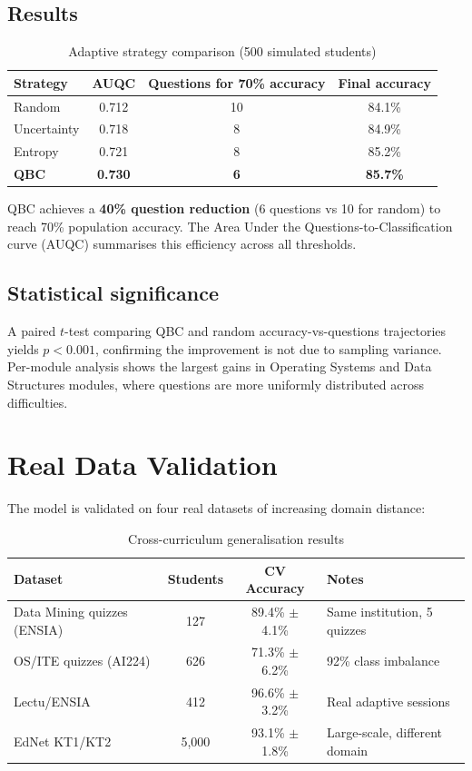 \documentclass[12pt,a4paper]{article}
\begin{document}
\subsection{Results}

\begin{table}[H]
\centering
\caption{Adaptive strategy comparison (500 simulated students)}
\begin{tabular}{@{}lccc@{}}
\toprule
Strategy & AUQC & Questions for 70\% accuracy & Final accuracy \\
\midrule
Random       & 0.712 & 10 & 84.1\% \\
Uncertainty  & 0.718 & 8  & 84.9\% \\
Entropy      & 0.721 & 8  & 85.2\% \\
\textbf{QBC} & \textbf{0.730} & \textbf{6} & \textbf{85.7\%} \\
\bottomrule
\end{tabular}
\end{table}

QBC achieves a \textbf{40\% question reduction} (6 questions vs 10 for random) to
reach 70\% population accuracy. The Area Under the Questions-to-Classification
curve (AUQC) summarises this efficiency across all thresholds.

\subsection{Statistical significance}

A paired $t$-test comparing QBC and random accuracy-vs-questions trajectories
yields $p < 0.001$, confirming the improvement is not due to sampling variance.
Per-module analysis shows the largest gains in Operating Systems and Data Structures
modules, where questions are more uniformly distributed across difficulties.

\section{Real Data Validation}
\label{sec:realdata}

The model is validated on four real datasets of increasing domain distance:

\begin{table}[H]
\centering
\caption{Cross-curriculum generalisation results}
\begin{tabular}{@{}lccl@{}}
\toprule
Dataset & Students & CV Accuracy & Notes \\
\midrule
Data Mining quizzes (ENSIA) & 127 & 89.4\% $\pm$ 4.1\% & Same institution, 5 quizzes \\
OS/ITE quizzes (AI224)      & 626 & 71.3\% $\pm$ 6.2\% & 92\% class imbalance \\
Lectu/ENSIA                 & 412 & 96.6\% $\pm$ 3.2\% & Real adaptive sessions \\
EdNet KT1/KT2               & 5,000 & 93.1\% $\pm$ 1.8\% & Large-scale, different domain \\
\bottomrule
\end{tabular}
\end{table}
\end{document}
